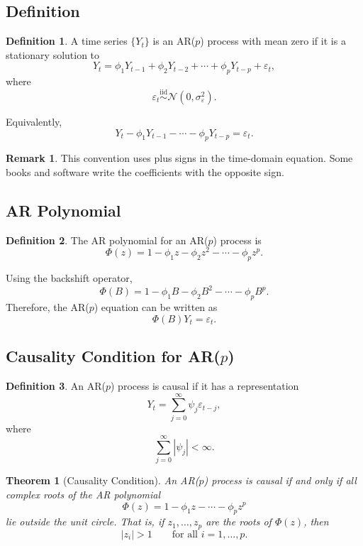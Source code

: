 \documentclass[12pt,oneside]{book}
\numberwithin{equation}{section}
\theoremstyle{definition}
\newtheorem{definition}{Definition}[section]
\newtheorem{remark}{Remark}[section]
\theoremstyle{plain}
\newtheorem{theorem}{Theorem}[section]
\theoremstyle{remark}
\newcommand{\iid}{\overset{\text{iid}}{\sim}}
\newcommand{\Normal}{\mathcal{N}}
\begin{document}
\subsection{Definition}

\begin{definition}
A time series $\{Y_t\}$ is an AR($p$) process with mean zero if it is a stationary solution to
\[
Y_t
=
\phi_1Y_{t-1}
+
\phi_2Y_{t-2}
+\cdots+
\phi_pY_{t-p}
+\varepsilon_t,
\]
where
\[
\varepsilon_t \iid \Normal(0,\sigma_\varepsilon^2).
\]
\end{definition}

Equivalently,
\[
Y_t-\phi_1Y_{t-1}-\cdots-\phi_pY_{t-p}
=
\varepsilon_t.
\]

\begin{remark}
This convention uses plus signs in the time-domain equation. Some books and software write the coefficients with the opposite sign.
\end{remark}

\subsection{AR Polynomial}

\begin{definition}
The AR polynomial for an AR($p$) process is
\[
\Phi(z)
=
1-\phi_1z-\phi_2z^2-\cdots-\phi_pz^p.
\]
\end{definition}

Using the backshift operator,
\[
\Phi(B)
=
1-\phi_1B-\phi_2B^2-\cdots-\phi_pB^p.
\]
Therefore, the AR($p$) equation can be written as
\[
\Phi(B)Y_t=\varepsilon_t.
\]

\subsection{Causality Condition for AR($p$)}

\begin{definition}
An AR($p$) process is causal if it has a representation
\[
Y_t
=
\sum_{j=0}^{\infty}\psi_j\varepsilon_{t-j},
\]
where
\[
\sum_{j=0}^{\infty}|\psi_j|<\infty.
\]
\end{definition}

\begin{theorem}[Causality Condition]
An AR($p$) process is causal if and only if all complex roots of the AR polynomial
\[
\Phi(z)=1-\phi_1z-\cdots-\phi_pz^p
\]
lie outside the unit circle. That is, if $z_1,\ldots,z_p$ are the roots of $\Phi(z)$, then
\[
|z_i|>1
\qquad
\text{for all } i=1,\ldots,p.
\]
\end{theorem}
\end{document}
